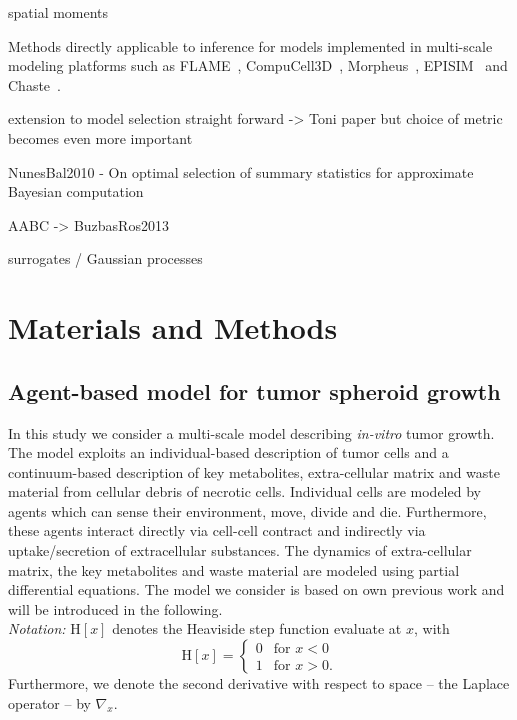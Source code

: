 \documentclass[10pt,letterpaper]{article}
\newcommand{\Heaviside}[1]{{\mathrm{H}\!\left[#1\right]}}
\begin{document}
spatial moments

Methods directly applicable to inference for models implemented in multi-scale modeling platforms such as FLAME~\cite{RichmondWal2010}, CompuCell3D~\cite{SwatTho2012}, Morpheus~\cite{StarrussBac2014}, EPISIM~\cite{SutterlinKol2013} and Chaste~\cite{MiramsArt2013}.

extension to model selection straight forward -> Toni paper
but choice of metric becomes even more important

NunesBal2010 - On optimal selection of summary statistics for approximate {B}ayesian computation 

AABC -> BuzbasRos2013

surrogates / Gaussian processes



\section*{Materials and Methods}

\subsection*{Agent-based model for tumor spheroid growth}
In this study we consider a multi-scale model describing \textit{in-vitro} tumor growth. The model exploits an individual-based description of tumor cells and a continuum-based description of key metabolites, extra-cellular matrix and waste material from cellular debris of necrotic cells. Individual cells are modeled by agents which can sense their environment, move, divide and die. Furthermore, these agents interact directly via cell-cell contract and indirectly via uptake/secretion of extracellular substances. The dynamics of extra-cellular matrix, the key metabolites and waste material are modeled using partial differential equations. The model we consider is based on own previous work \cite{JagiellaMul2015} and will be introduced in the following.
\\[2ex]
\noindent \textit{Notation:} $\Heaviside{x}$ denotes the Heaviside step function evaluate at $x$, with 
\begin{equation*}
\Heaviside{x} =  \left\{\begin{array}{ll}0 & \text{for } x < 0 \\ 1  &\text{for } x > 0. \end{array}\right.
\end{equation*}
Furthermore, we denote the second derivative with respect to space -- the Laplace operator -- by $\nabla_x$.
\end{document}
